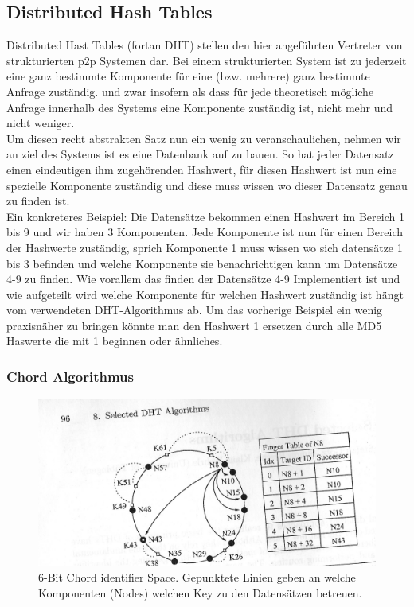 \documentclass[a4paper,12pt]{scrreprt}
\begin{document}
			\subsection{Distributed Hash Tables}
				
				Distributed Hast Tables (fortan DHT) stellen den hier angeführten Vertreter von strukturierten p2p Systemen dar. Bei einem strukturierten System ist zu jederzeit eine ganz bestimmte Komponente für eine (bzw. mehrere) ganz bestimmte Anfrage zuständig. und zwar insofern als dass für jede theoretisch mögliche Anfrage innerhalb des Systems eine Komponente zuständig ist, nicht mehr und nicht weniger. \\Um diesen recht abstrakten Satz nun ein wenig zu veranschaulichen, nehmen wir an ziel des Systems ist es eine Datenbank auf zu bauen. So hat jeder Datensatz einen eindeutigen ihm zugehörenden Hashwert, für diesen Hashwert ist nun eine spezielle Komponente zuständig und diese muss wissen wo dieser Datensatz genau zu finden ist. \\ Ein konkreteres Beispiel: Die Datensätze bekommen einen Hashwert im Bereich 1 bis 9 und wir haben 3 Komponenten. Jede Komponente ist nun für einen Bereich der Hashwerte zuständig, sprich Komponente 1 muss wissen wo sich datensätze 1 bis 3 befinden und welche Komponente sie benachrichtigen kann um Datensätze 4-9 zu finden. Wie vorallem das finden der Datensätze 4-9 Implementiert ist und wie aufgeteilt wird welche Komponente für welchen Hashwert zuständig ist hängt vom verwendeten DHT-Algorithmus ab. Um das vorherige Beispiel ein wenig praxisnäher zu bringen könnte man den Hashwert 1 ersetzen durch alle MD5 Haswerte die mit 1 beginnen oder ähnliches.
				\pagebreak
				\subsubsection{Chord Algorithmus}
					\begin{figure}[h]
						\centering
						\includegraphics[width=0.7\linewidth]{./graphics/Chord}
						\caption{6-Bit Chord identifier Space. Gepunktete Linien geben an welche Komponenten (Nodes) welchen Key zu den Datensätzen betreuen.}
						\label{fig:Chord}
					\end{figure}
\end{document}
